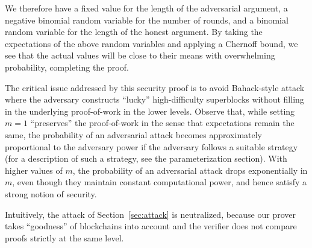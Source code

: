 We therefore have a fixed value for the length of the adversarial argument, a
negative binomial random variable for the number of rounds, and a binomial
random variable for the length of the honest argument. By taking the
expectations of the above random variables and applying a Chernoff bound, we see
that the actual values will be close to their means with overwhelming
probability, completing the proof.

\begin{remark}
\label{rmk.variance}
The critical issue addressed by this security proof is to avoid Bahack-style
attack \cite{bahack} where the adversary constructs ``lucky'' high-difficulty
superblocks without filling in the underlying proof-of-work in the lower
levels. Observe that, while setting $m = 1$ ``preserves'' the proof-of-work in
the sense that expectations remain the same, the probability of an adversarial
attack becomes approximately proportional to the adversary power if the
adversary follows a suitable strategy (for a description of such a strategy,
see the parameterization section). With higher values of $m$, the probability of
an adversarial attack drops exponentially in $m$, even though they maintain constant
computational power, and hence satisfy a strong notion of security. 
\end{remark}

\begin{remark}
Intuitively, the attack of Section~\ref{sec:attack} is neutralized, because 
our prover takes ``goodness'' of blockchains into account and the verifier
does not compare proofs strictly at the same level. 
\end{remark}